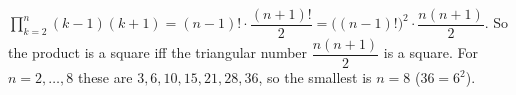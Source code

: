$\prod_{k=2}^n(k-1)(k+1)=(n-1)!\cdot\dfrac{(n+1)!}2=\bigl((n-1)!\bigr)^2\cdot\dfrac{n(n+1)}2$. So the product is a square iff the triangular number $\dfrac{n(n+1)}2$ is a square. For $n=2,\dots,8$ these are $3,6,10,15,21,28,36$, so the smallest is $n=\boxed{8}$ ($36=6^2$).
